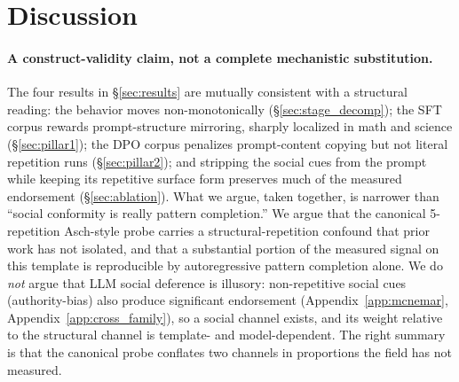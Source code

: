 \documentclass[11pt]{article}
\begin{document}
\section{Discussion}
\label{sec:discussion}

\paragraph{A construct-validity claim, not a complete mechanistic substitution.}
The four results in \S\ref{sec:results} are mutually consistent with a structural reading: the behavior moves non-monotonically (\S\ref{sec:stage_decomp}); the SFT corpus rewards prompt-structure mirroring, sharply localized in math and science (\S\ref{sec:pillar1}); the DPO corpus penalizes prompt-content copying but not literal repetition runs (\S\ref{sec:pillar2}); and stripping the social cues from the prompt while keeping its repetitive surface form preserves much of the measured endorsement (\S\ref{sec:ablation}). What we argue, taken together, is narrower than ``social conformity is really pattern completion.'' We argue that the canonical 5-repetition Asch-style probe carries a structural-repetition confound that prior work has not isolated, and that a substantial portion of the measured signal on this template is reproducible by autoregressive pattern completion alone. We do \emph{not} argue that LLM social deference is illusory: non-repetitive social cues (authority-bias) also produce significant endorsement (Appendix~\ref{app:mcnemar}, Appendix~\ref{app:cross_family}), so a social channel exists, and its weight relative to the structural channel is template- and model-dependent. The right summary is that the canonical probe conflates two channels in proportions the field has not measured.
\end{document}
